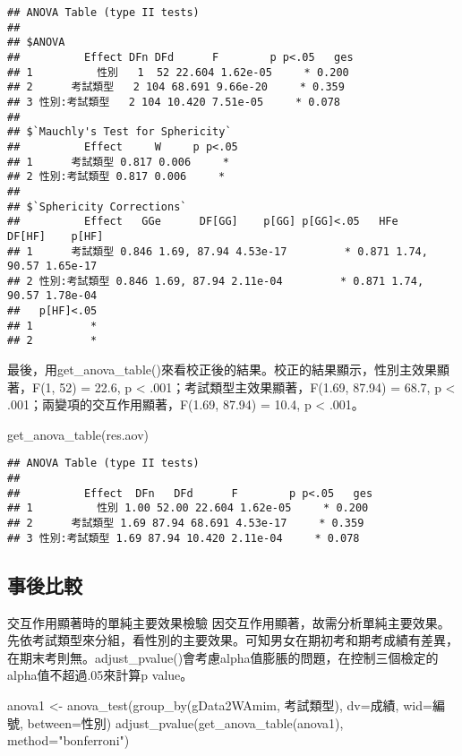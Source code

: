 \documentclass[
]{book}
\newenvironment{Shaded}{\begin{snugshade}}{\end{snugshade}}
\newcommand{\AttributeTok}[1]{\textcolor[rgb]{0.77,0.63,0.00}{#1}}
\newcommand{\FunctionTok}[1]{\textcolor[rgb]{0.00,0.00,0.00}{#1}}
\newcommand{\NormalTok}[1]{#1}
\newcommand{\OtherTok}[1]{\textcolor[rgb]{0.56,0.35,0.01}{#1}}
\newcommand{\StringTok}[1]{\textcolor[rgb]{0.31,0.60,0.02}{#1}}
\begin{document}
\begin{verbatim}
## ANOVA Table (type II tests)
## 
## $ANOVA
##          Effect DFn DFd      F        p p<.05   ges
## 1          性別   1  52 22.604 1.62e-05     * 0.200
## 2      考試類型   2 104 68.691 9.66e-20     * 0.359
## 3 性別:考試類型   2 104 10.420 7.51e-05     * 0.078
## 
## $`Mauchly's Test for Sphericity`
##          Effect     W     p p<.05
## 1      考試類型 0.817 0.006     *
## 2 性別:考試類型 0.817 0.006     *
## 
## $`Sphericity Corrections`
##          Effect   GGe      DF[GG]    p[GG] p[GG]<.05   HFe      DF[HF]    p[HF]
## 1      考試類型 0.846 1.69, 87.94 4.53e-17         * 0.871 1.74, 90.57 1.65e-17
## 2 性別:考試類型 0.846 1.69, 87.94 2.11e-04         * 0.871 1.74, 90.57 1.78e-04
##   p[HF]<.05
## 1         *
## 2         *
\end{verbatim}

最後，用get\_anova\_table()來看校正後的結果。校正的結果顯示，性別主效果顯著，F(1, 52) = 22.6, p \textless{} .001；考試類型主效果顯著，F(1.69, 87.94) = 68.7, p \textless{} .001；兩變項的交互作用顯著，F(1.69, 87.94) = 10.4, p \textless{} .001。

\begin{Shaded}
\begin{Highlighting}[]
\FunctionTok{get\_anova\_table}\NormalTok{(res.aov)}
\end{Highlighting}
\end{Shaded}

\begin{verbatim}
## ANOVA Table (type II tests)
## 
##          Effect  DFn   DFd      F        p p<.05   ges
## 1          性別 1.00 52.00 22.604 1.62e-05     * 0.200
## 2      考試類型 1.69 87.94 68.691 4.53e-17     * 0.359
## 3 性別:考試類型 1.69 87.94 10.420 2.11e-04     * 0.078
\end{verbatim}

\hypertarget{ux4e8bux5f8cux6bd4ux8f03-1}{%
\subsection{事後比較}\label{ux4e8bux5f8cux6bd4ux8f03-1}}

交互作用顯著時的單純主要效果檢驗
因交互作用顯著，故需分析單純主要效果。先依考試類型來分組，看性別的主要效果。可知男女在期初考和期考成績有差異，在期末考則無。adjust\_pvalue()會考慮alpha值膨脹的問題，在控制三個檢定的alpha值不超過.05來計算p value。

\begin{Shaded}
\begin{Highlighting}[]
\NormalTok{anova1 }\OtherTok{\textless{}{-}} \FunctionTok{anova\_test}\NormalTok{(}\FunctionTok{group\_by}\NormalTok{(gData2WAmim, 考試類型), }\AttributeTok{dv=}\NormalTok{成績, }\AttributeTok{wid=}\NormalTok{編號, }\AttributeTok{between=}\NormalTok{性別)}
\FunctionTok{adjust\_pvalue}\NormalTok{(}\FunctionTok{get\_anova\_table}\NormalTok{(anova1), }\AttributeTok{method=}\StringTok{"bonferroni"}\NormalTok{)}
\end{Highlighting}
\end{Shaded}
\end{document}
